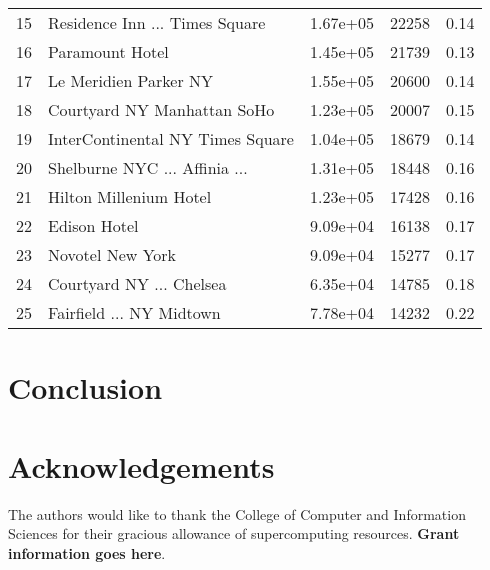 \documentclass[useAMS, usenatbib]{biom}
\begin{document}
\begin{table}
\begin{center}
{\begin{tabular}{||c|l|c|c|c||}
15 & Residence Inn ... Times Square & 1.67e+05 & 22258 &  0.14 \\
16 & Paramount Hotel & 1.45e+05 &  21739 &  0.13 \\
17 & Le Meridien Parker NY & 1.55e+05 & 20600 &  0.14 \\
18 & Courtyard NY Manhattan SoHo & 1.23e+05 & 20007 &  0.15 \\
19 & InterContinental NY Times Square & 1.04e+05 & 18679 &  0.14 \\
20 & Shelburne NYC ... Affinia ... & 1.31e+05 & 18448 &  0.16 \\
21 & Hilton Millenium Hotel & 1.23e+05 & 17428 &  0.16 \\
22 & Edison Hotel & 9.09e+04 & 16138 &  0.17 \\
23 & Novotel New York & 9.09e+04 & 15277 &  0.17 \\
24 & Courtyard NY ... Chelsea & 6.35e+04 & 14785 &  0.18 \\
25 & Fairfield ... NY Midtown & 7.78e+04 & 14232 &  0.22 \\
\hline
\end{tabular}
}
\end{center}
\end{table}

\section{Conclusion}
\label{s:conclusion}

\backmatter

\section*{Acknowledgements}

The authors would like to thank the College of Computer and Information Sciences for their gracious allowance of supercomputing resources. \textbf{Grant information goes here}.

 


\label{lastpage}
\end{document}
